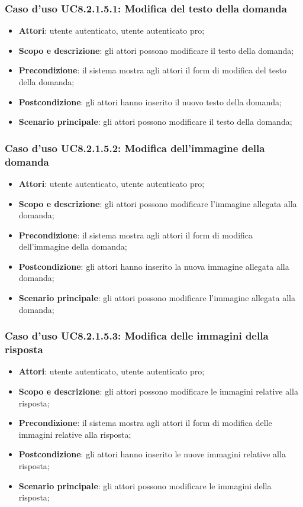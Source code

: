 \subsubsection{Caso d’uso UC8.2.1.5.1: Modifica del testo della domanda}
\begin{itemize}
	\item\textbf{Attori}: utente autenticato, utente autenticato pro;
	\item\textbf{Scopo e descrizione}: gli attori possono modificare il testo della domanda;
	\item\textbf{Precondizione}: il sistema mostra agli attori il form di modifica del testo della domanda; 
	\item \textbf{Postcondizione}: gli attori hanno inserito il nuovo testo della domanda;
	\item\textbf{Scenario principale}: gli attori possono modificare il testo della domanda;
\end{itemize}

\subsubsection{Caso d’uso UC8.2.1.5.2: Modifica dell'immagine della domanda}
\begin{itemize}
	\item\textbf{Attori}: utente autenticato, utente autenticato pro;
	\item\textbf{Scopo e descrizione}: gli attori possono modificare l'immagine allegata alla domanda;
	\item\textbf{Precondizione}: il sistema mostra agli attori il form di modifica dell'immagine della domanda; 
	\item \textbf{Postcondizione}: gli attori hanno inserito la nuova immagine allegata alla domanda;
	\item\textbf{Scenario principale}: gli attori possono modificare l'immagine allegata alla domanda;
\end{itemize}

\subsubsection{Caso d’uso UC8.2.1.5.3: Modifica delle immagini della risposta}
\begin{itemize}
	\item\textbf{Attori}: utente autenticato, utente autenticato pro;
	\item\textbf{Scopo e descrizione}: gli attori possono modificare le immagini relative alla risposta;
	\item\textbf{Precondizione}: il sistema mostra agli attori il form di modifica delle immagini relative alla risposta; 
	\item \textbf{Postcondizione}: gli attori hanno inserito le nuove immagini relative alla risposta;
	\item\textbf{Scenario principale}: gli attori possono modificare le immagini della risposta;
\end{itemize}

